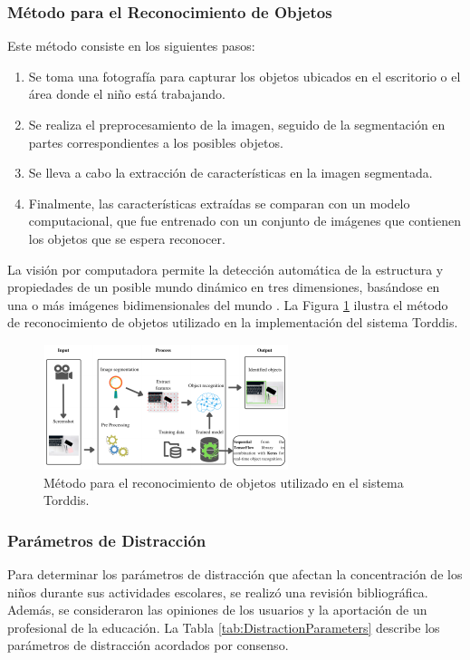 \documentclass[a4paper,fleqn]{cas-sc}
\begin{document}
		\subsubsection{Método para el Reconocimiento de Objetos}
		Este método consiste en los siguientes pasos:
		\begin{enumerate}
			\item Se toma una fotografía para capturar los objetos ubicados en el escritorio o el área donde el niño está trabajando.
			\item Se realiza el preprocesamiento de la imagen, seguido de la segmentación en partes correspondientes a los posibles objetos.
			\item Se lleva a cabo la extracción de características en la imagen segmentada.
			\item Finalmente, las características extraídas se comparan con un modelo computacional, que fue entrenado con un conjunto de imágenes que contienen los objetos que se espera reconocer.
		\end{enumerate}
		
		La visión por computadora permite la detección automática de la estructura y propiedades de un posible mundo dinámico en tres dimensiones, basándose en una o más imágenes bidimensionales del mundo \citep{Cruz2013}. La Figura \ref{fig:ObjectRecognition} ilustra el método de reconocimiento de objetos utilizado en la implementación del sistema Torddis.
		
		\begin{figure}[h]
			\centering
			\includegraphics[frame,scale=0.5, width=\linewidth]{figs/Figure_4}
			\caption{Método para el reconocimiento de objetos utilizado en el sistema Torddis.\label{fig:ObjectRecognition}}
		\end{figure} 
		
		\subsubsection{Parámetros de Distracción}
		Para determinar los parámetros de distracción que afectan la concentración de los niños durante sus actividades escolares, se realizó una revisión bibliográfica. Además, se consideraron las opiniones de los usuarios y la aportación de un profesional de la educación. La Tabla \ref{tab:DistractionParameters} describe los parámetros de distracción acordados por consenso.
		
\end{document}
